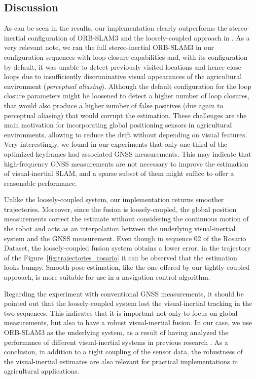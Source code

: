 \subsection{Discussion}
As can be seen in the results, our implementation clearly outperforms the stereo-inertial configuration of ORB-SLAM3 and the loosely-coupled approach in \cite{qin2019general}. As a very relevant note, we ran the full stereo-inertial ORB-SLAM3 in our configuration sequences with loop closure capabilities and, with its configuration by default, it was unable to detect previously visited locations and hence close loops due to insufficiently discriminative visual appearances of the agricultural environment (\emph{perceptual aliasing}). Although the default configuration for the loop closure parameters might be loosened to detect a higher number of loop closures, that would also produce a higher number of false positives (due again to perceptual aliasing) that would corrupt the estimation. These challenges are the main motivation for incorporating global positioning sensors in agricultural environments, allowing to reduce the drift without depending on visual features. Very interestingly, we found in our experiments that only one third of the optimized keyframes had associated GNSS measurements. This may indicate that high-frequency GNSS measurements are not necessary to improve the estimation of visual-inertial SLAM, and a sparse subset of them might suffice to offer a reasonable performance.

Unlike the loosely-coupled system, our implementation returns smoother trajectories. Moreover, since the fusion is loosely-coupled, the global position measurements correct the estimate without considering the continuous motion of the robot and acts as an interpolation between the underlying visual-inertial system and the GNSS measurement. Even though in sequence 02 of the Rosario Dataset, the loosely-coupled fusion system obtains a lower error, in the trajectory of the Figure~\ref{fig:trajectories_rosario} it can be observed that the estimation looks bumpy. Smooth pose estimation, like the one offered by our tightly-coupled approach, is more suitable for use in a navigation control algorithm.

Regarding the experiment with conventional GNSS measurements, it should be pointed out that the loosely-coupled system lost the visual-inertial tracking in the two sequences. This indicates that it is important not only to focus on global measurements, but also to have a robust visual-inertial fusion. In our case, we use ORB-SLAM3 as the underlying system, as a result of having analyzed the performance of different visual-inertial systems in previous research \cite{cremona2022evaluation}. As a conclusion, in addition to a tight coupling of the sensor data, the robustness of the visual-inertial estimates are also relevant for practical implementations in agricultural applications.

